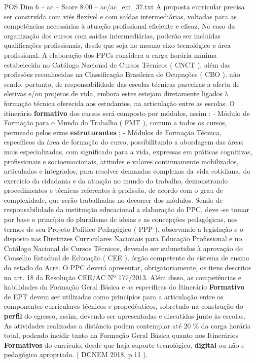 \begin{textsample}{POS Dim 6 – ac – Score 8.00 – ac/ac\_em\_37.txt}
A proposta curricular precisa ser construída com viés flexível e com saídas intermediárias, voltadas para as competências necessárias à atuação profissional eficiente e eficaz.
No caso da organização dos cursos com saídas intermediárias, poderão ser incluídas qualificações profissionais, desde que seja no mesmo eixo tecnológico e área profissional.
A elaboração dos PPCs considera a carga horária mínima estabelecida no Catálogo Nacional de Cursos Técnicos ( CNCT ), além das profissões reconhecidas na Classificação Brasileira de Ocupações ( CBO ), não sendo, portanto, de responsabilidade das escolas técnicas parceiras a oferta de eletivas e/ou projetos de vida, embora estes estejam diretamente ligados à formação técnica oferecida aos estudantes, na articulação entre as escolas.
O itinerário \textbf{formativo} dos cursos será composto por módulos, assim : - Módulo de Formação para o Mundo do Trabalho ( FMT ), comum a todos os cursos, permeado pelos eixos \textbf{estruturantes} ; - Módulos de Formação Técnica, específicos da área de formação do curso, possibilitando a abordagem das áreas mais especializadas, com significado para a vida, expressas em práticas cognitivas, profissionais e socioemocionais, atitudes e valores continuamente mobilizados, articulados e integrados, para resolver demandas complexas da vida cotidiana, do exercício da cidadania e da atuação no mundo do trabalho, demonstrando procedimentos e técnicas referentes à profissão, de acordo com o grau de complexidade, que serão trabalhadas no decorrer dos módulos.
Sendo de responsabilidade da instituição educacional a elaboração do PPC, deve -se tomar por base o princípio do pluralismo de ideias e as concepções pedagógicas, nos termos de seu Projeto Político Pedagógico ( PPP ), observando a legislação e o disposto nas Diretrizes Curriculares Nacionais para Educação Profissional e no Catálogo Nacional de Cursos Técnicos, devendo ser submetidos à aprovação do Conselho Estadual de Educação ( CEE ), órgão competente do sistema de ensino do estado do Acre.
O PPC deverá apresentar, obrigatoriamente, os itens descritos no art. 18 da Resolução CEE/AC Nº 177/2013.
Além disso, as competências e habilidades da Formação Geral Básica e as específicas do Itinerário \textbf{Formativo} de EPT devem ser utilizadas como princípios para a articulação entre os componentes curriculares técnicos e propedêuticos, sobretudo na construção do \textbf{perfil} do egresso, assim, devendo ser apresentadas e discutidas junto às escolas.
As atividades realizadas a distância podem contemplar até 20 \% da carga horária total, podendo incidir tanto na Formação Geral Básica quanto nos Itinerários \textbf{Formativos} do currículo, desde que haja suporte tecnológico, \textbf{digital} ou não e pedagógico apropriado. ( DCNEM 2018, p.11 ).

\end{textsample}
